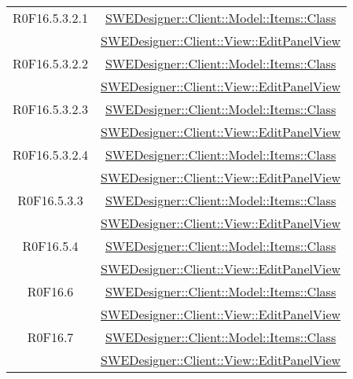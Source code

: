 \documentclass[../DefinizioneDiProdotto.tex]{subfiles}
\begin{document}
\begin{longtable}{|c|c|}
				R0F16.5.3.2.1
				& \hyperlink{SWEDesigner::Client::Model::Items::Class}{SWEDesigner::Client::Model::Items::Class}\\
				& \hyperlink{SWEDesigner::Client::View::EditPanelView}{SWEDesigner::Client::View::EditPanelView}\\
				\hline

				R0F16.5.3.2.2
				& \hyperlink{SWEDesigner::Client::Model::Items::Class}{SWEDesigner::Client::Model::Items::Class}\\
				& \hyperlink{SWEDesigner::Client::View::EditPanelView}{SWEDesigner::Client::View::EditPanelView}\\
				\hline

				R0F16.5.3.2.3
				& \hyperlink{SWEDesigner::Client::Model::Items::Class}{SWEDesigner::Client::Model::Items::Class}\\
				& \hyperlink{SWEDesigner::Client::View::EditPanelView}{SWEDesigner::Client::View::EditPanelView}\\
				\hline

				R0F16.5.3.2.4
				& \hyperlink{SWEDesigner::Client::Model::Items::Class}{SWEDesigner::Client::Model::Items::Class}\\
				& \hyperlink{SWEDesigner::Client::View::EditPanelView}{SWEDesigner::Client::View::EditPanelView}\\
				\hline

				R0F16.5.3.3
				& \hyperlink{SWEDesigner::Client::Model::Items::Class}{SWEDesigner::Client::Model::Items::Class}\\
				& \hyperlink{SWEDesigner::Client::View::EditPanelView}{SWEDesigner::Client::View::EditPanelView}\\
				\hline

				R0F16.5.4
				& \hyperlink{SWEDesigner::Client::Model::Items::Class}{SWEDesigner::Client::Model::Items::Class}\\
				& \hyperlink{SWEDesigner::Client::View::EditPanelView}{SWEDesigner::Client::View::EditPanelView}\\
				\hline

				R0F16.6
				& \hyperlink{SWEDesigner::Client::Model::Items::Class}{SWEDesigner::Client::Model::Items::Class}\\
				& \hyperlink{SWEDesigner::Client::View::EditPanelView}{SWEDesigner::Client::View::EditPanelView}\\
				\hline

				R0F16.7
				& \hyperlink{SWEDesigner::Client::Model::Items::Class}{SWEDesigner::Client::Model::Items::Class}\\
				& \hyperlink{SWEDesigner::Client::View::EditPanelView}{SWEDesigner::Client::View::EditPanelView}\\
				\hline


\end{longtable}
\end{document}
